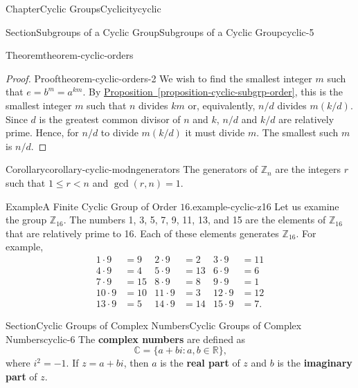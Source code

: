 \documentclass[oneside,10pt,]{book}
\newcommand{\xreffont}{\relax}
\newcommand{\terminology}[1]{\textbf{#1}}
\numberwithin{equation}{section}
\newcommand{\lt}{<}
\begin{document}
\begin{chapterptx}{Chapter}{Cyclic Groups}{}{Cyclicity}{}{}{cyclic}
\begin{sectionptx}{Section}{Subgroups of a Cyclic Group}{}{Subgroups of a Cyclic Group}{}{}{cyclic-5}
\begin{theorem}{Theorem}{}{}{theorem-cyclic-orders}
\end{theorem}
\begin{proof}{Proof}{}{theorem-cyclic-orders-2}
We wish to find the smallest integer \(m\) such that \(e = b^m = a^{km}\). By \hyperref[proposition-cyclic-subgrp-order]{Proposition~{\xreffont\ref{proposition-cyclic-subgrp-order}}}, this is the smallest integer \(m\) such that \(n\) divides \(km\) or, equivalently, \(n/d\) divides \(m(k/d)\).  Since \(d\) is the greatest common divisor of \(n\) and \(k\), \(n/d\) and \(k/d\) are relatively prime. Hence, for \(n/d\) to divide \(m(k/d)\) it must divide \(m\).  The smallest such \(m\) is \(n/d\).%
\end{proof}
\begin{corollary}{Corollary}{}{}{corollary-cyclic-modngenerators}%
The generators of \({\mathbb Z}_n\) are the integers \(r\) such that \(1 \leq r \lt n\) and \(\gcd(r,n) =  1\).%
\end{corollary}
\begin{example}{Example}{A Finite Cyclic Group of Order \(16\).}{example-cyclic-z16}%
Let us examine the group \({\mathbb Z}_{16}\).  The numbers 1, 3, 5, 7, 9, 11, 13, and 15 are the elements of \({\mathbb Z}_{16}\) that are relatively prime to 16.  Each of these elements generates \({\mathbb Z}_{16}\). For example,%
\begin{align*}
1 \cdot 9  & =  9  &  2 \cdot 9  & = 2  & 3 \cdot 9  & = 11\\
4 \cdot 9  & =  4  &  5 \cdot 9  & = 13 &     6 \cdot 9 & = 6\\
7 \cdot 9  & =  15 & 8 \cdot 9  & = 8  &  9 \cdot 9 &  = 1\\
10 \cdot 9 & =  10 & 11 \cdot 9 & = 3  & 12 \cdot 9 &  = 12\\
13 \cdot 9 & =  5 & 14 \cdot 9 & = 14 &   15 \cdot 9 & = 7\text{.}
\end{align*}
%
\end{example}
\end{sectionptx}
%
%
\typeout{************************************************}
\typeout{************************************************}
%
\begin{sectionptx}{Section}{Cyclic Groups of Complex Numbers}{}{Cyclic Groups of Complex Numbers}{}{}{cyclic-6}
The \terminology{complex numbers} are defined as%
\begin{equation*}
{\mathbb C} = \{ a + bi : a, b \in {\mathbb R} \}\text{,}
\end{equation*}
where \(i^2 = -1\).  If \(z = a + bi\), then \(a\) is the \terminology{real part} of \(z\) and \(b\) is the \terminology{imaginary part} of \(z\).%

\end{sectionptx}
\end{chapterptx}
\end{document}
